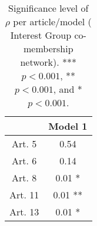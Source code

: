 \begin{table}[ht]
\centering
\begin{tabular}{cc}
  \toprule
 & Model 1 \\ 
  \midrule
Art. 5 & 0.54   \\ 
   \midrule
Art. 6 & 0.14   \\ 
   \midrule
Art. 8 & 0.01 * \\ 
   \midrule
Art. 11 & 0.01 ** \\ 
   \midrule
Art. 13 & 0.01 * \\ 
   \bottomrule
\end{tabular}
\caption{Significance level of $\rho$ per article/model ( Interest Group co-membership network). *** $p < 0.001$, ** $p < 0.001$, and * $p < 0.001$.} 
\end{table}
